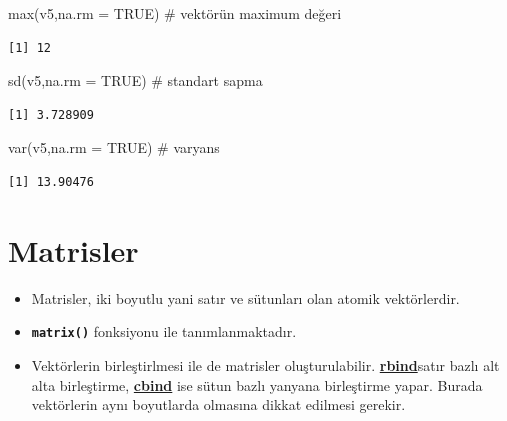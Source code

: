 \documentclass[
  letterpaper,
  DIV=11,
  numbers=noendperiod]{scrreprt}
\newenvironment{Shaded}{\begin{snugshade}}{\end{snugshade}}
\newcommand{\AttributeTok}[1]{\textcolor[rgb]{0.40,0.45,0.13}{#1}}
\newcommand{\CommentTok}[1]{\textcolor[rgb]{0.37,0.37,0.37}{#1}}
\newcommand{\ConstantTok}[1]{\textcolor[rgb]{0.56,0.35,0.01}{#1}}
\newcommand{\FunctionTok}[1]{\textcolor[rgb]{0.28,0.35,0.67}{#1}}
\newcommand{\NormalTok}[1]{\textcolor[rgb]{0.00,0.23,0.31}{#1}}
\begin{document}
\begin{Shaded}
\begin{Highlighting}[]
\FunctionTok{max}\NormalTok{(v5,}\AttributeTok{na.rm =} \ConstantTok{TRUE}\NormalTok{) }\CommentTok{\# vektörün maximum değeri}
\end{Highlighting}
\end{Shaded}

\begin{verbatim}
[1] 12
\end{verbatim}

\begin{Shaded}
\begin{Highlighting}[]
\FunctionTok{sd}\NormalTok{(v5,}\AttributeTok{na.rm =} \ConstantTok{TRUE}\NormalTok{) }\CommentTok{\# standart sapma}
\end{Highlighting}
\end{Shaded}

\begin{verbatim}
[1] 3.728909
\end{verbatim}

\begin{Shaded}
\begin{Highlighting}[]
\FunctionTok{var}\NormalTok{(v5,}\AttributeTok{na.rm =} \ConstantTok{TRUE}\NormalTok{) }\CommentTok{\# varyans}
\end{Highlighting}
\end{Shaded}

\begin{verbatim}
[1] 13.90476
\end{verbatim}

\hypertarget{matrisler}{%
\section{Matrisler}\label{matrisler}}

\begin{itemize}
\item
  Matrisler, iki boyutlu yani satır ve sütunları olan atomik
  vektörlerdir.
\item
  \textbf{\texttt{matrix()}} fonksiyonu ile tanımlanmaktadır.
\item
  Vektörlerin birleştirlmesi ile de matrisler oluşturulabilir.
  \ul{\textbf{rbind}}satır bazlı alt alta birleştirme,
  \ul{\textbf{cbind}} ise sütun bazlı yanyana birleştirme yapar. Burada
  vektörlerin aynı boyutlarda olmasına dikkat edilmesi gerekir.
\end{itemize}
\end{document}
